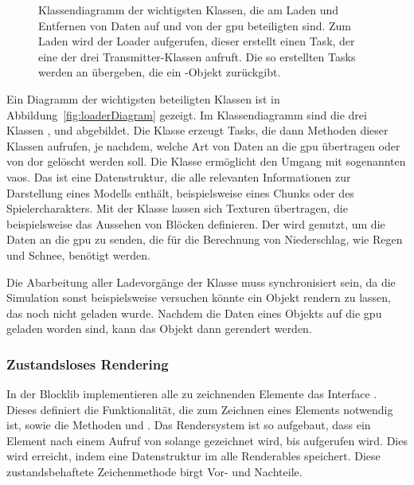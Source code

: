 \begin{figure}
	
	\caption{Klassendiagramm der wichtigsten Klassen, die am Laden und Entfernen von Daten auf und von der \ac{gpu} beteiligten sind. Zum Laden wird der Loader aufgerufen, dieser erstellt einen Task, der eine der drei Transmitter-Klassen aufruft. Die so erstellten Tasks werden an  übergeben, die ein -Objekt zurückgibt.}\label{fig:loaderDiagram}
\end{figure}
Ein Diagramm der wichtigsten beteiligten Klassen ist in Abbildung~\vref{fig:loaderDiagram} gezeigt. Im Klassendiagramm sind die drei Klassen ,  und  abgebildet. Die Klasse  erzeugt Tasks, die dann Methoden dieser Klassen aufrufen, je nachdem, welche Art von Daten an die \ac{gpu} übertragen oder von dor gelöscht werden soll. Die Klasse  ermöglicht den Umgang mit sogenannten \acp{vao}. Das ist eine Datenstruktur, die alle relevanten Informationen zur Darstellung eines Modells enthält, beispielsweise eines Chunks oder des Spielercharakters. Mit der Klasse  lassen sich Texturen übertragen, die beispielsweise das Aussehen von Blöcken definieren. Der  wird genutzt, um die Daten an die \ac{gpu} zu senden, die für die Berechnung von Niederschlag, wie Regen und Schnee, benötigt werden.


Die Abarbeitung aller Ladevorgänge der Klasse  muss synchronisiert sein, da die Simulation sonst beispielsweise versuchen könnte ein Objekt rendern zu lassen, das noch nicht geladen wurde. Nachdem die Daten eines Objekts auf die \ac{gpu} geladen worden sind, kann das Objekt dann gerendert werden.

\subsubsection{Zustandsloses Rendering}\label{sec:statelessRendering}
In der Blocklib implementieren alle zu zeichnenden Elemente das Interface . Dieses definiert die Funktionalität, die zum Zeichnen eines Elements notwendig ist, sowie die Methoden  und . Das Rendersystem ist so aufgebaut, dass ein Element nach einem Aufruf von  solange gezeichnet wird, bis  aufgerufen wird. Dies wird erreicht, indem eine Datenstruktur im  alle Renderables speichert. Diese zustandsbehaftete Zeichenmethode birgt Vor- und Nachteile.

